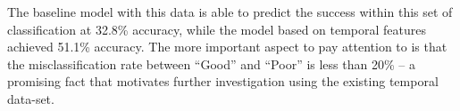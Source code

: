 The baseline model with this data is able to predict the success within this set of classification at 32.8\% accuracy, while the model based on temporal features achieved 51.1\% accuracy. The more important aspect to pay attention to is that the misclassification rate between “Good” and “Poor” is less than 20\% -- a promising fact that motivates further investigation using the existing temporal data-set.